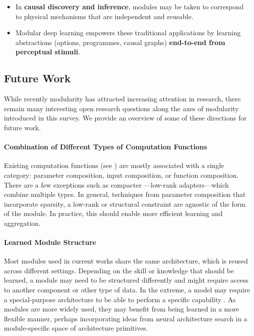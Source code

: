 \documentclass[10pt]{article} %
\begin{document}
\begin{tcolorbox}
{\begin{itemize}
        \item In \textbf{causal discovery and inference}, modules may be taken to correspond to physical mechanisms that are independent and reusable.
        \item Modular deep learning empowers these traditional applications by learning abstractions (options, programmes, causal graphs) \textbf{end-to-end from perceptual stimuli}.
    \end{itemize}
    }%
\end{tcolorbox}

\iftrue
\subsection{Future Work}

While recently modularity has attracted increasing attention in research, there remain many interesting open research questions along the axes of modularity introduced in this survey. We provide an overview of some of these directions for future work.

\paragraph*{Combination of Different Types of Computation Functions} Existing computation functions (see ) are mostly associated with a single category: parameter composition, input composition, or function composition. There are a few exceptions such as compacter \citep{Mahabadi2021Compacter}---low-rank adapters---which combine multiple types. In general, techniques from parameter composition that incorporate sparsity, a low-rank or structural constraint are agnostic of the form of the module. In practice, this should enable more efficient learning and aggregation.  

\paragraph*{Learned Module Structure} Most modules used in current works share the same architecture, which is reused across different settings. Depending on the skill or knowledge that should be learned, a module may need to be structured differently and might require access to another component or other type of data. In the extreme, a model may require a special-purpose architecture to be able to perform a specific capability \citep{andreas2016nmn}. As modules are more widely used, they may benefit from being learned in a more flexible manner, perhaps incorporating ideas from neural architecture search \citep{negrinho2019towards} in a module-specific space of architecture primitives. 
\end{document}
